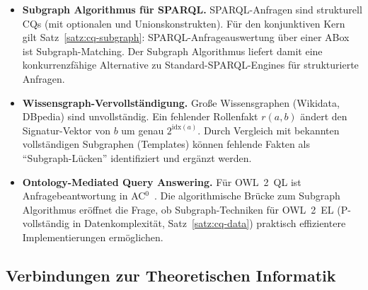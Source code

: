 ﻿\documentclass[a4paper,12pt]{article}
\theoremstyle{definition}
\theoremstyle{plain}
\theoremstyle{remark}
\begin{document}
\begin{itemize}
  \item \textbf{Subgraph Algorithmus f{\"u}r SPARQL.}
        SPARQL-Anfragen sind strukturell CQs (mit optionalen und
        Unionskonstrukten). F{\"u}r den konjunktiven Kern gilt
        Satz~\ref{satz:cq-subgraph}: SPARQL-Anfrageauswertung
        {\"u}ber einer ABox ist Subgraph-Matching.
        Der Subgraph Algorithmus liefert damit eine
        konkurrenzf{\"a}hige Alternative zu Standard-SPARQL-Engines
        f{\"u}r strukturierte Anfragen.

  \item \textbf{Wissensgraph-Vervollst{\"a}ndigung.}
        Gro{\ss}e Wissensgraphen (Wikidata, DBpedia) sind unvollst{\"a}ndig.
        Ein fehlender Rollenfakt $r(a, b)$ {\"a}ndert den Signatur-Vektor
        von $b$ um genau $2^{\mathrm{idx}(a)}$.
        Durch Vergleich mit bekannten vollst{\"a}ndigen Subgraphen
        (Templates) k{\"o}nnen fehlende Fakten als ``Subgraph-L{\"u}cken''
        identifiziert und erg{\"a}nzt werden.

  \item \textbf{Ontology-Mediated Query Answering.}
        F{\"u}r OWL~2~QL ist Anfragebeantwortung in \textsc{AC}$^0$~\cite{Calvanese2007}.
        Die algorithmische Br{\"u}cke zum Subgraph Algorithmus er{\"o}ffnet
        die Frage, ob Subgraph-Techniken f{\"u}r OWL~2~EL
        (\textsc{P}-vollst{\"a}ndig in Datenkomplexit{\"a}t, Satz~\ref{satz:cq-data})
        praktisch effizientere Implementierungen erm{\"o}glichen.
\end{itemize}

\subsection{Verbindungen zur Theoretischen Informatik}
\end{document}
